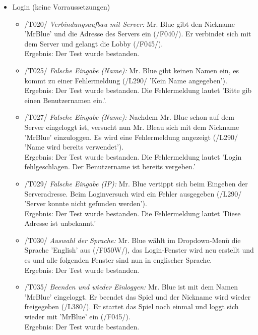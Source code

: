 \documentclass[a4paper]{article}
\begin{document}
\begin{itemize}
	\item Login (keine Vorraussetzungen)
	\begin{itemize}
		
		\item /T020/ \textit{Verbindungsaufbau mit Server:} Mr. Blue gibt den Nickname 'MrBlue' und die Adresse des 			Servers ein (/F040/). Er verbindet sich mit dem Server und gelangt die Lobby (/F045/). \\
		Ergebnis: Der Test wurde bestanden.
		
		\item /T025/ \textit{Falsche Eingabe (Name):} Mr. Blue gibt keinen Namen ein, es kommt zu einer Fehlermeldung 				(/L290/ 'Kein Name angegeben'). \\
		Ergebnis: Der Test wurde bestanden. Die Fehlermeldung lautet 'Bitte gib einen Benutzernamen ein.'.
		
		\item /T027/ \textit{Falsche Eingabe (Name):} Nachdem Mr. Blue schon auf dem Server eingeloggt ist, 				versucht nun Mr. Bleau sich mit dem Nickname 'MrBlue' einzuloggen. Es wird eine Fehlermeldung angezeigt (/L290/ 			'Name wird bereits verwendet'). \\
		Ergebnis: Der Test wurde bestanden. Die Fehlermeldung lautet 'Login fehlgeschlagen. Der Benutzername ist bereits 			vergeben.'
		
		\item /T029/ \textit{Falsche Eingabe (IP):} Mr. Blue vertippt sich beim Eingeben der Serveradresse. Beim 				Loginversuch wird ein Fehler ausgegeben (/L290/  'Server konnte nicht gefunden werden'). \\
		Ergebnis: Der Test wurde bestanden. Die Fehlermeldung lautet 'Diese Adresse ist unbekannt.'
		
		\item /T030/ \textit{Auswahl der Sprache:} Mr. Blue wählt im Dropdown-Menü die Sprache 'English' aus (/F050W/), 			das Login-Fenster wird neu erstellt und es und alle folgenden Fenster sind nun in englischer Sprache. \\
		Ergebnis: Der Test wurde bestanden.
		
		\item /T035/ \textit{Beenden und wieder Einloggen:} Mr. Blue ist mit dem Namen 'MrBlue' eingeloggt. Er beendet das 		Spiel und der Nickname wird wieder freigegeben (/L380/). Er startet das Spiel noch einmal und loggt sich wieder mit 			'MrBlue' ein (/F045/). \\
		Ergebnis: Der Test wurde bestanden.
		

\end{itemize}
\end{itemize}
\end{document}
